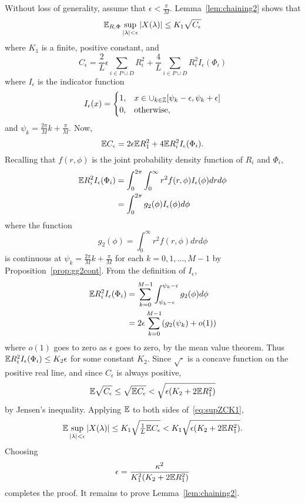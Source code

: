 \documentclass[journal]{IEEEtran}
\begin{document}
\begin{IEEEproof}
Without loss of generality, assume that $\epsilon < \tfrac{\pi}{M}$.  Lemma~\ref{lem:chaining2} shows that
\begin{equation}\label{eq:supZCK1} 
{\mathbb E}_{R,\Phi} \sup_{{\vert \lambda \vert} < \epsilon} {\left\vert  X(\lambda)  \right\vert} \leq K_1 \sqrt{C_\epsilon}
\end{equation}
where $K_1$ is a finite, positive constant, and
\begin{equation}\label{eq:Cepsdefn}
C_\epsilon = \frac{2}{L}\epsilon\sum_{i\in P \cup D}R_i^2 + \frac{4}{L}\sum_{i\in P \cup D}R_i^2 I_{\epsilon}(\Phi_i)
\end{equation}
where $I_\epsilon$ is the indicator function
\[
I_{\epsilon}(x) = \begin{cases}
1, & x \in \cup_{k\in{\mathbb Z}}[\psi_k - \epsilon, \psi_k + \epsilon] \\
0, & \text{otherwise},
\end{cases}
\] 
and $\psi_k = \tfrac{2\pi}{M}k + \tfrac{\pi}{M}$.  Now,
\[
{\mathbb E} C_\epsilon =  2\epsilon{\mathbb E} R_1^2 + 4 {\mathbb E} R_i^2 I_{\epsilon}(\Phi_i).
\]
Recalling that $f(r,\phi)$ is the joint probability density function of $R_i$ and $\Phi_i$,
\begin{align*}
{\mathbb E} R_i^2 I_\epsilon(\Phi_i) &= \int_0^{2\pi} \int_{0}^\infty  r^2 f(r,\phi) I_\epsilon(\phi) dr d\phi \\ 
&= \int_0^{2\pi}g_2(\phi) I_\epsilon(\phi) d\phi 
\end{align*}
where the function
\[
g_2(\phi) = \int_{0}^\infty  r^2 f(r,\phi) dr d\phi 
\]
is continuous at $\psi_k = \tfrac{2\pi}{M}k + \tfrac{\pi}{M}$ for each $k = 0, 1, \dots, M-1$ by Proposition~\ref{prop:gg2cont}.  From the definition of $I_\epsilon$,
\begin{align*}
{\mathbb E} R_i^2 I_\epsilon(\Phi_i) &= \sum_{k=0}^{M-1}\int_{\psi_k-\epsilon}^{\psi_k-\epsilon}g_2(\phi) d\phi \\
&= 2\epsilon \sum_{k=0}^{M-1} (g_2(\psi_k) + o(1))
\end{align*}
where $o(1)$ goes to zero as $\epsilon$ goes to zero, by the mean value theorem.  Thus ${\mathbb E} R_i^2 I_\epsilon(\Phi_i) \leq K_2\epsilon$ for some constant $K_2$. Since $\sqrt{\cdot}$ is a concave function on the positive real line, and since $C_{\epsilon}$ is always positive,
\[
{\mathbb E} \sqrt{C_\epsilon} \leq  \sqrt{{\mathbb E}  C_\epsilon} < \sqrt{\epsilon( K_2 + 2{\mathbb E} R_1^2)  }
\]
by Jensen's inequality.  Applying ${\mathbb E}$ to both sides of~\eqref{eq:supZCK1},
\[
{\mathbb E} \sup_{{\vert \lambda \vert} < \epsilon} {\left\vert  X(\lambda)  \right\vert} \leq K_1 \sqrt{\tfrac{1}{L}{\mathbb E} C_\epsilon} < K_1 \sqrt{\epsilon( K_2 + 2{\mathbb E} R_1^2)}.
\]
Choosing 
\[
\epsilon = \frac{\kappa^2}{ K_1^2 ( K_2 + 2{\mathbb E} R_1^2)}
\] 
completes the proof.  It remains to prove Lemma~\ref{lem:chaining2}.
\end{IEEEproof}
\end{document}
